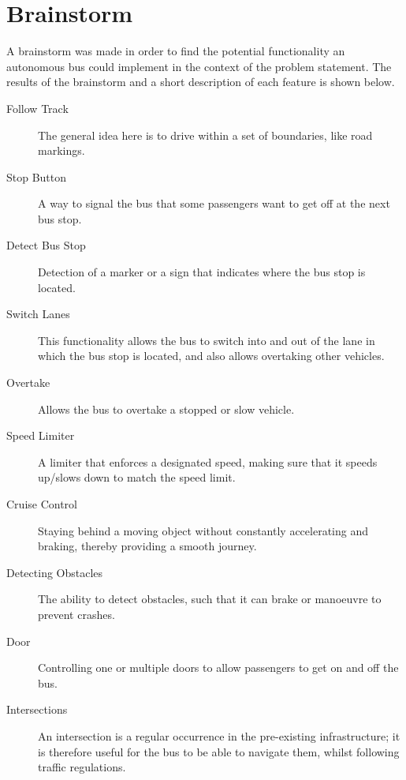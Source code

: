 \section{Brainstorm}

A brainstorm was made in order to find the potential functionality an autonomous bus could implement in the context of the problem statement. The results of the brainstorm and a short description of each feature is shown below. 

\begin{description}
\item [Follow Track]
The general idea here is to drive within a set of boundaries, like road markings.

\item[Stop Button]
A way to signal the bus that some passengers want to get off at the next bus stop.

\item[Detect Bus Stop]
Detection of a marker or a sign that indicates where the bus stop is located.

\item[Switch Lanes]
This functionality allows the bus to switch into and out of the lane in which the bus stop is located, and also allows overtaking other vehicles. 

\item[Overtake]
Allows the bus to overtake a stopped or slow vehicle. 

\item[Speed Limiter]
A limiter that enforces a designated speed, making sure that it speeds up/slows down to match the speed limit.

\item[Cruise Control]
Staying behind a moving object without constantly accelerating and braking, thereby providing a smooth journey.

\item[Detecting Obstacles]
The ability to detect obstacles, such that it can brake or manoeuvre to prevent crashes.

\item[Door]
Controlling one or multiple doors to allow passengers to get on and off the bus.

\item[Intersections]
An intersection is a regular occurrence in the pre-existing infrastructure; it is therefore useful for the bus to be able to navigate them, whilst following traffic regulations.


\end{description}

